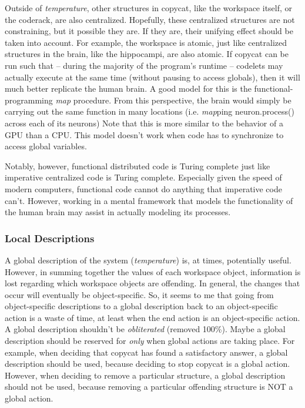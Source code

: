 \documentclass[a4paper]{article}
\begin{document}
    Outside of \emph{temperature}, other structures in copycat, like the workspace itself, or the coderack, are also centralized.
    Hopefully, these centralized structures are not constraining, but it possible they are.
    If they are, their unifying effect should be taken into account.
    For example, the workspace is atomic, just like centralized structures in the brain, like the hippocampi, are also atomic.
    If copycat can be run such that -- during the majority of the program's runtime -- codelets may actually execute at the same time (without pausing to access globals), then it will much better replicate the human brain.
    A good model for this is the functional-programming \emph{map} procedure.
    From this perspective, the brain would simply be carrying out the same function in many locations (i.e. \emph{map}ping neuron.process() across each of its neurons)
    Note that this is more similar to the behavior of a GPU than a CPU.
    This model doesn't work when code has to synchronize to access global variables.

    Notably, however, functional distributed code is Turing complete just like imperative centralized code is Turing complete.
    Especially given the speed of modern computers, functional code cannot do anything that imperative code can't.
    However, working in a mental framework that models the functionality of the human brain may assist in actually modeling its processes.

    \subsubsection{Local Descriptions}

    A global description of the system (\emph{temperature}) is, at times, potentially useful.
    However, in summing together the values of each workspace object, information is lost regarding which workspace objects are offending.
    In general, the changes that occur will eventually be object-specific.
    So, it seems to me that going from object-specific descriptions to a global description back to an object-specific action is a waste of time, at least when the end action is an object-specific action.
    A global description shouldn't be \emph{obliterated} (removed 100\%).
    Maybe a global description should be reserved for \emph{only} when global actions are taking place.
    For example, when deciding that copycat has found a satisfactory answer, a global description should be used, because deciding to stop copycat is a global action.
    However, when deciding to remove a particular structure, a global description should not be used, because removing a particular offending structure is NOT a global action.
\end{document}

